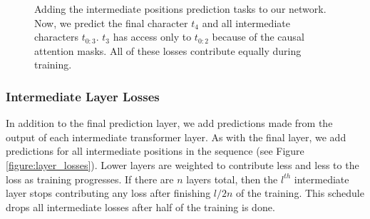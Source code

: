 \documentclass[letterpaper]{article}
\begin{document}
\begin{figure}[htb]
  \centering
  \caption{Adding the intermediate positions prediction tasks to our network. Now, we predict the final character $t_4$ and all intermediate characters $t_{0:3}$. $t_3$ has access only to $t_{0:2}$ because of the causal attention masks. All of these losses contribute equally during training.}
  \label{figure:multiple_positions}
\end{figure} 
\subsubsection{Intermediate Layer Losses}
\label{section:intermediate_layer_losses}

In addition to the final prediction layer, we add predictions made from the output of each intermediate transformer layer.
As with the final layer, we add predictions for all intermediate positions in the sequence (see Figure \ref{figure:layer_losses}).
Lower layers are weighted to contribute less and less to the loss as training progresses.
If there are $n$ layers total, then the $l^{th}$ intermediate layer stops contributing any loss after finishing $l/2n$ of the training. 
This schedule drops all intermediate losses after half of the training is done.
\end{document}
